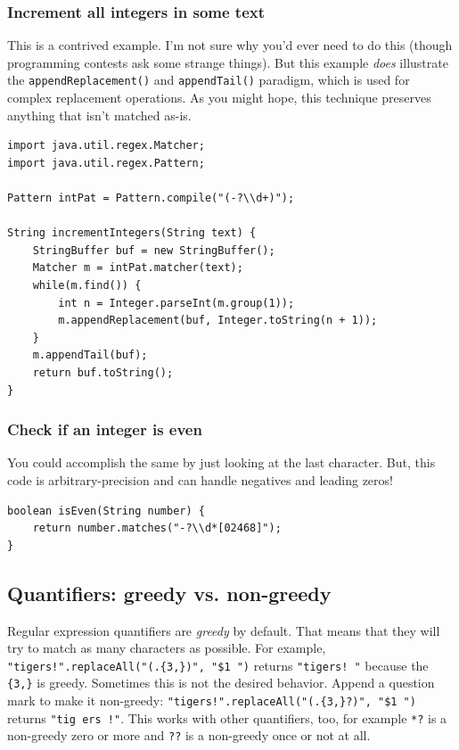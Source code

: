 \documentclass[a4paper,12pt]{article}
\begin{document}
\subsubsection{Increment all integers in some text}
This is a contrived example. I'm not sure why you'd ever need to do this (though programming contests ask some strange things). But this example {\em does} illustrate the \lstinline/appendReplacement()/ and \lstinline/appendTail()/ paradigm, which is used for complex replacement operations. As you might hope, this technique preserves anything that isn't matched as-is.
\begin{lstlisting}
import java.util.regex.Matcher;
import java.util.regex.Pattern;

Pattern intPat = Pattern.compile("(-?\\d+)");

String incrementIntegers(String text) {
	StringBuffer buf = new StringBuffer();
	Matcher m = intPat.matcher(text);
	while(m.find()) {
		int n = Integer.parseInt(m.group(1));
		m.appendReplacement(buf, Integer.toString(n + 1));
	}
	m.appendTail(buf);
	return buf.toString();
}
\end{lstlisting}

\subsubsection{Check if an integer is even}
You could accomplish the same by just looking at the last character. But, this code is arbitrary-precision and can handle negatives and leading zeros!
\begin{lstlisting}
boolean isEven(String number) {
	return number.matches("-?\\d*[02468]");
}
\end{lstlisting}

\subsection{Quantifiers: greedy vs. non-greedy}
Regular expression quantifiers are {\em greedy} by default. That means that they will try to match as many characters as possible. For example, \lstinline/"tigers!".replaceAll("(.{3,})", "$1 ")/ returns \lstinline/"tigers! "/ because the \lstinline/{3,}/ is greedy. Sometimes this is not the desired behavior. Append a question mark to make it non-greedy: \lstinline/"tigers!".replaceAll("(.{3,}?)", "$1 ")/ returns \lstinline/"tig ers !"/. This works with other quantifiers, too, for example \lstinline/*?/ is a non-greedy zero or more and \lstinline/??/ is a non-greedy once or not at all.
\end{document}
